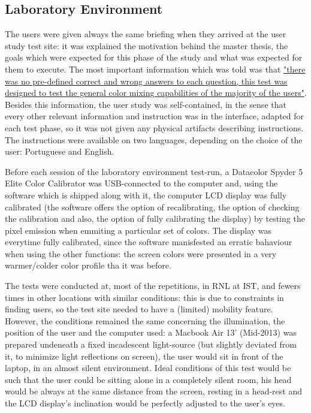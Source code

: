 \subsection{Laboratory Environment}
%
The users were given always the same briefing when they arrived at the user study test site: it was explained the motivation behind the master
thesis, the goals which were expected for this phase of the study and what was expected for them to execute. The most important information which
was told was that \ul{"there was no pre-defined correct and wrong answers to each question, this test was designed to test the general
color mixing capabilities of the majority of the users"}. Besides this information, the user study was self-contained, in the sense that
every other relevant information and instruction was in the interface, adapted for each test phase, so it was not given any physical artifacts
describing instructions. The instructions were available on two languages, depending on the choice of the user: Portuguese and English. \par
%
Before each session of the laboratory environment test-run, a Datacolor Spyder 5 Elite Color Calibrator was USB-connected to the computer and, using
the software which is shipped along with it, the computer LCD display was fully calibrated (the software offers the option of recalibrating,
the option of checking the calibration and also, the option of fully calibrating the display) by testing the pixel emission when emmiting a particular
set of colors. The display was everytime fully calibrated, since the software manisfested an erratic bahaviour when using the other functions:
the screen colors were presented in a very warmer/colder color profile tha it was before. \par
%
The tests were conducted at, most of the repetitions, in \gls{RNL} at \gls{IST}, and fewers times in other locations with similar conditions:
this is due to constraints in finding users, so the test site needed to have a (limited) mobility feature. However, the conditions remained
the same concerning the illumination, the position of the user and the computer used: a Macbook Air 13' (Mid-2013) was prepared undeneath
a fixed incadescent light-source (but slightly deviated from it, to minimize light reflections on screen), the user would sit in front
of the laptop, in an almost silent environment. Ideal conditions of this test would be such that the user could be sitting alone in a completely
silent room, his head would be always at the same distance from the screen, resting in a head-rest and the LCD display's inclination would be perfectly
adjusted to the user's eyes.
%
